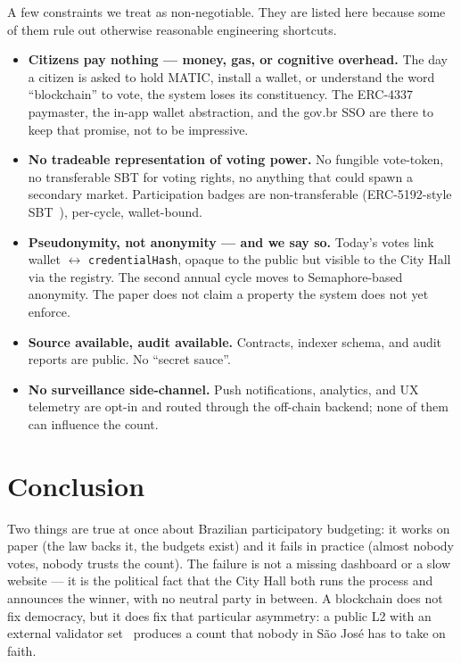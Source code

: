 \documentclass[12pt]{article}
\begin{document}
\noindent A few constraints we treat as non-negotiable. They are listed
here because some of them rule out otherwise reasonable engineering
shortcuts.

\begin{itemize}
  \item \textbf{Citizens pay nothing --- money, gas, or cognitive overhead.}
        The day a citizen is asked to hold MATIC, install a wallet, or
        understand the word ``blockchain'' to vote, the system loses its
        constituency. The ERC-4337~\cite{eip4337} paymaster, the in-app
        wallet abstraction, and the gov.br SSO are there to keep that
        promise, not to be impressive.
  \item \textbf{No tradeable representation of voting power.} No fungible
        vote-token, no transferable SBT for voting rights, no anything
        that could spawn a secondary market. Participation badges are
        non-transferable (ERC-5192-style
        SBT~\cite{eip5192,ohlhaver2022desoc}), per-cycle, wallet-bound.
  \item \textbf{Pseudonymity, not anonymity --- and we say so.} Today's
        votes link wallet $\leftrightarrow$ \texttt{credentialHash},
        opaque to the public but visible to the City Hall via the
        registry. The second annual cycle moves to Semaphore-based
        anonymity. The paper does not claim a property the system does
        not yet enforce.
  \item \textbf{Source available, audit available.} Contracts, indexer
        schema, and audit reports are public. No ``secret sauce''.
  \item \textbf{No surveillance side-channel.} Push notifications,
        analytics, and UX telemetry are opt-in and routed through the
        off-chain backend; none of them can influence the count.
\end{itemize}

\section{Conclusion}
\label{sec:conclusion}

Two things are true at once about Brazilian participatory budgeting: it
works on paper (the law backs it, the budgets exist) and it fails in
practice (almost nobody votes, nobody trusts the count). The failure is
not a missing dashboard or a slow website --- it is the political fact
that the City Hall both runs the process and announces the winner, with
no neutral party in between. A blockchain does not fix democracy, but it
does fix that particular asymmetry: a public L2 with an external
validator set~\cite{polygondocs} produces a count that nobody in S\~ao
Jos\'e has to take on faith.
\end{document}
